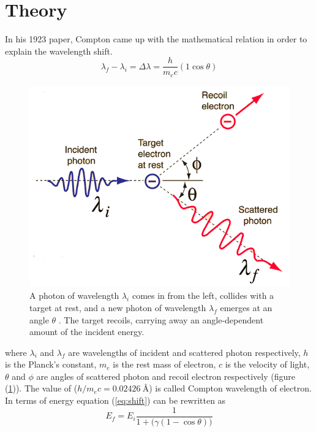 \documentclass[%
 reprint,
nofootinbib,
 amsmath,amssymb,
 aps,
floatfix,
]{revtex4-2}
\begin{document}
\section{Theory}
    In his 1923 paper, Compton came up with the mathematical relation in order to explain the wavelength shift.
    \begin{equation}
    \label{eq:shift}
        \lambda_f - \lambda_i = \Delta \lambda = \dfrac{h}{m_e c}(1 \cos \theta)
    \end{equation}
    \begin{figure}
        \centering
        \includegraphics[scale = 0.37]{Figures/Compton_feynman.png}
        \caption{A photon of wavelength $\lambda_i$ comes in from the left, collides with a target at rest, and a new photon of wavelength $\lambda_f$ emerges at an angle $\theta$ . The target recoils, carrying away an angle-dependent amount of the incident energy.}
        \label{fig:compton}
    \end{figure}
    where $\lambda_i$ and $\lambda_f$ are wavelengths of incident and scattered photon respectively, $h$ is the Planck’s constant, $m_e$ is the rest mass of electron, $c$ is the velocity of light, $\theta$ and $\phi$ are angles of scattered photon and recoil electron respectively (figure (\ref{fig:compton})). The value of ($h/m_e c = \SI{0.02426}{\angstrom}$) is called Compton wavelength of electron. In terms of energy equation (\ref{eq:shift}) can be rewritten as
    \begin{equation}
        E_f = E_i \dfrac{1}{1 + \big( \gamma (1 - \cos \theta) \big)}
    \end{equation}
\end{document}
